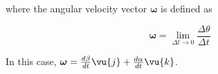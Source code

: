 \documentclass[a4paper,12pt]{report}
\begin{document}
\begin{appendices}
where the angular velocity vector \(\boldsymbol{\omega } \) is defined as 

\begin{equation}
	\boldsymbol{\omega } = \lim_{\Delta t\to 0} \frac{\Delta \theta }{\Delta t} 
\end{equation}

In this case, \(\boldsymbol{\omega } = \frac{d\beta }{dt}  \vu{j} + \frac{d\alpha }{dt}  \vu{k} \). 




















































\end{appendices}
\end{document}
